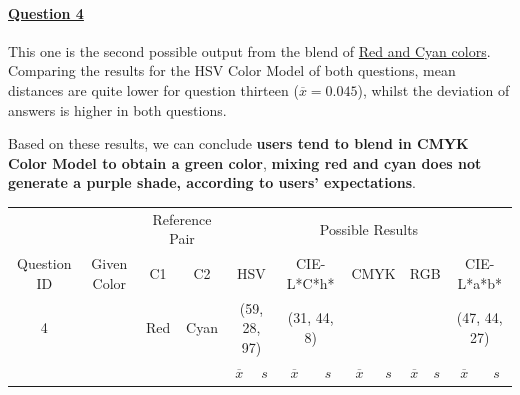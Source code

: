 \paragraph{\ul{Question 4}}
%
This one is the second possible output from the blend of \ul{Red and Cyan colors}. Comparing the results for the HSV Color Model of both questions, mean distances are quite lower for question thirteen
($\overline{x} = 0.045$), whilst the deviation of answers is higher in both questions. \par
%
Based on these results, we can conclude \textbf{users tend to blend in CMYK Color Model to obtain a green color}, \textbf{mixing red and cyan
does not generate a purple shade, according to users' expectations}.
%
\begin{table}[H]
  \resizebox{\textwidth}{!} {
  \begin{tabular}{lccccccccccccc}
    \hline
    \multicolumn{1}{c}{}                              &                                      & \multicolumn{2}{c}{Reference Pair}                   & \multicolumn{10}{c}{Possible Results}                                                                                                                                                                                                                                                                                        \\ \cline{3-14}
    \multicolumn{1}{c}{\multirow{-2}{*}{Question ID}} & \multirow{-2}{*}{Given Color}        & C1                       & C2                         & \multicolumn{2}{c}{HSV}                                        & \multicolumn{2}{c}{CIE-L*C*h*}                                 & \multicolumn{2}{c}{CMYK}                                       & \multicolumn{2}{c}{RGB}                                        & \multicolumn{2}{c}{CIE-L*a*b*}                                 \\ \hline
    \multicolumn{1}{c}{4}                             & \cellcolor[HTML]{7F00FF}{\color[HTML]{FFFFFF}(27, 12, 95)} & \multicolumn{1}{c|}{Red} & \multicolumn{1}{c|}{Cyan}  & \multicolumn{2}{c|}{\cellcolor[HTML]{FF00FF}(59, 28, 97)}      & \multicolumn{2}{c|}{\cellcolor[HTML]{91C01D}(31, 44, 8)}       & \multicolumn{2}{c|}{\cellcolor[HTML]{808080}{\color[HTML]{FFFFFF}(21, 22, 24)}}       & \multicolumn{2}{c|}{\cellcolor[HTML]{808080}{\color[HTML]{FFFFFF}(21, 22, 24)}}       & \multicolumn{2}{c|}{\cellcolor[HTML]{DDA581}(47, 44, 27)}       \\ \hline
                                                      & \multicolumn{1}{l}{}                 & \multicolumn{1}{l}{}     & \multicolumn{1}{l}{}       & \multicolumn{1}{c}{$\overline{x}$} & \multicolumn{1}{c}{$s$} & \multicolumn{1}{c}{$\overline{x}$} & \multicolumn{1}{c}{$s$} & \multicolumn{1}{c}{$\overline{x}$} & \multicolumn{1}{c}{$s$} & \multicolumn{1}{c}{$\overline{x}$} & \multicolumn{1}{c}{$s$} & \multicolumn{1}{c}{$\overline{x}$} & \multicolumn{1}{c}{$s$} \\ \hline

\end{tabular}}
\end{table}
